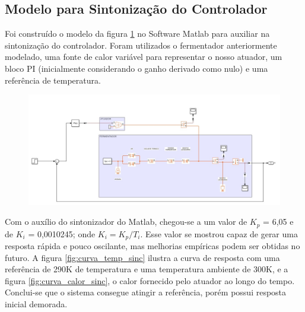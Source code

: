 \subsection{Modelo para Sintonização do Controlador}

Foi construído o modelo da figura \ref{fig:modelo_circuito_sinc} no Software Matlab para auxiliar na sintonização do controlador. Foram utilizados o fermentador anteriormente modelado, uma fonte de calor variável para representar o nosso atuador, um bloco PI (inicialmente considerando o ganho derivado como nulo) e uma referência de temperatura. 

\begin{figure}[H]
    \centering
    \includegraphics[scale=0.37]{figuras/projeto/controle/modelo_circuito_sinc.jpeg}
    \label{fig:modelo_circuito_sinc}
\end{figure}

Com o auxílio do sintonizador do Matlab, chegou-se a um valor de \(K_p\) = 6,05 e de \(K_i\) = 0,0010245; onde \(K_i = K_p/T_i\). Esse valor se mostrou capaz de gerar uma resposta rápida e pouco oscilante, mas melhorias empíricas podem ser obtidas no futuro.
A figura \ref{fig:curva_temp_sinc} ilustra a curva de resposta com uma referência de 290K de temperatura e uma temperatura ambiente de 300K, e a figura \ref{fig:curva_calor_sinc}, o calor fornecido pelo atuador ao longo do tempo. Conclui-se que o sistema consegue atingir a referência, porém possui resposta inicial demorada.

